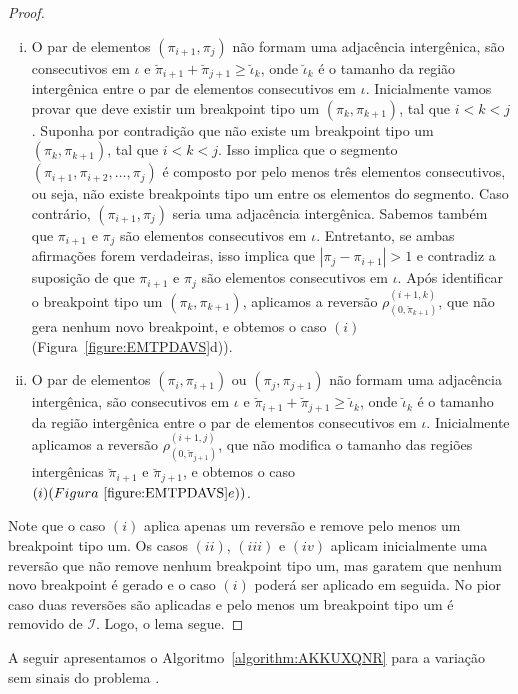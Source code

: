 \begin{proof}
\begin{enumerate}[i.]
    \item O par de elementos $(\pi_{i+1},\pi_{j})$ não formam uma adjacência intergênica, são consecutivos em $\iota$ e $\breve\pi_{i+1} + \breve\pi_{j+1} \ge \breve\iota_k$, onde $\breve\iota_k$ é o tamanho da região intergênica entre o par de elementos consecutivos em $\iota$. Inicialmente vamos provar que deve existir um breakpoint tipo um $(\pi_k,\pi_{k+1})$, tal que $i < k < j$. Suponha por contradição que não existe um breakpoint tipo um $(\pi_k,\pi_{k+1})$, tal que $i < k < j$. Isso implica que o segmento $(\pi_{i+1},\pi_{i+2},\dots,\pi_j)$ é composto por pelo menos três elementos consecutivos, ou seja, não existe breakpoints tipo um entre os elementos do segmento. Caso contrário, $(\pi_{i+1},\pi_{j})$ seria uma adjacência intergênica. Sabemos também que $\pi_{i+1}$ e $\pi_{j}$ são elementos consecutivos em $\iota$. Entretanto, se ambas afirmações forem verdadeiras, isso implica que $|\pi_j - \pi_{i+1}| > 1$ e contradiz a suposição de que $\pi_{i+1}$ e $\pi_{j}$ são elementos consecutivos em $\iota$. Após identificar o breakpoint tipo um $(\pi_k,\pi_{k+1})$, aplicamos a reversão $\rho^{(i+1,k)}_{(0,\breve\pi_{k+1})}$, que não gera nenhum novo breakpoint, e obtemos o caso $(i)$ (Figura~\ref{figure:EMTPDAVS}d)).
    \item O par de elementos $(\pi_{i},\pi_{i+1})$ ou $(\pi_{j},\pi_{j+1})$ não formam uma adjacência intergênica, são consecutivos em $\iota$ e $\breve\pi_{i+1} + \breve\pi_{j+1} \ge \breve\iota_k$, onde $\breve\iota_k$ é o tamanho da região intergênica entre o par de elementos consecutivos em $\iota$. Inicialmente aplicamos a reversão $\rho^{(i+1, j)}_{(0,\breve\pi_{j+1})}$, que não modifica o tamanho das regiões intergênicas $\breve\pi_{i+1}$ e $\breve\pi_{j+1}$, e obtemos o caso $(i) (Figura~\ref{figure:EMTPDAVS}e))$.
\end{enumerate}
Note que o caso $(i)$ aplica apenas um reversão e remove pelo menos um breakpoint tipo um. Os casos $(ii)$, $(iii)$ e $(iv)$ aplicam inicialmente uma reversão que não remove nenhum breakpoint tipo um, mas garatem que nenhum novo breakpoint é gerado e o caso $(i)$ poderá ser aplicado em seguida. No pior caso duas reversões são aplicadas e pelo menos um breakpoint tipo um é removido de $\mathcal{I}$. Logo, o lema segue. 
\end{proof}



A seguir apresentamos o Algoritmo~\ref{algorithm:AKKUXQNR} para a variação sem sinais do problema \SbIR{}.  

